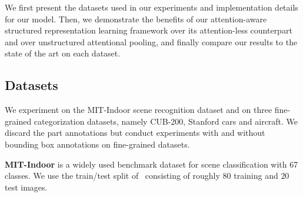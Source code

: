 \documentclass{bmvc2k}
\newcommand{\comment}[1]{}
\newcommand{\ms}[1]{{\color{blue}{#1}}}
\newcommand{\comment}[1]{}
\newcommand{\ms}[1]{ #1 }
\begin{document}

We first present the datasets used in our experiments and implementation details for our model. Then, we demonstrate the benefits of our attention-aware structured representation learning framework over its attention-less counterpart and over unstructured attentional pooling, and finally compare our results to the state of the art on each dataset. 
\ms{We provide additional results and ablation studies in the supplementary material.}\comment{
We report the accuracy of standalone attention module without structured representation in Section~\ref{sec:Attention_results}. The results suggest attention module can be reliably used as weakly-supervised localization of informative regions contributing to target label. 
We then show the benefits of attention-aware structured representation learning framework in Section~\ref{sec:Att_structured} consistently outperforming the attention-less systems.
We finally compare our method with current state-of-the-art in Section~\ref{sec:state-of-the-art}, particularity with methods that use higher order statistics~\cite{bcnn,mfafvnet,netvlad,fisher2013}
}\subsection{Datasets}\label{sec:Datasets}

We experiment on the MIT-Indoor scene recognition dataset and on three fine-grained categorization datasets, namely CUB-200, Stanford cars and aircraft. We discard the part annotations but conduct experiments with and without bounding box annotations on fine-grained datasets.

\textbf{MIT-Indoor} is a widely used benchmark dataset for scene classification with 67 classes.
We use the train/test split of~\cite{mitindoor2009} consisting of roughly $80$ training and $20$ test images.
\end{document}
